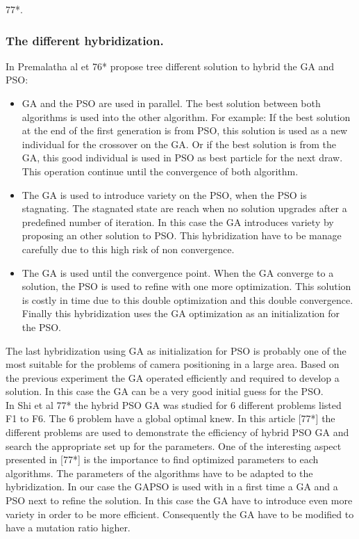    77*\cite{c13}.
\subsubsection{The different hybridization.}

In Premalatha al et 76*  propose tree different solution to hybrid the GA and PSO: 
\begin{itemize}
\item  GA and the PSO are used in parallel. The best solution between both algorithms is used into the other algorithm. 
For example: If the best solution at the end of the first generation is from PSO, this solution is used as a new individual for the crossover on the GA. Or if the best solution is from the GA, this good individual is used in PSO as best particle for the next draw. This operation continue until the convergence of both algorithm.   
 
\item The GA is used to introduce variety on the PSO, when the PSO is stagnating. The stagnated state are reach when no solution upgrades after a predefined number of iteration. In this case the GA introduces variety by proposing an other solution to PSO. This hybridization have to be manage carefully due to this high risk of non convergence. 

\item The GA is used until the convergence point. When the GA converge to a solution, the PSO is used to refine  with one more optimization. This solution is costly in time due to this double optimization and this double convergence. Finally this hybridization uses the GA optimization as an initialization for the PSO.\\
\end{itemize}

The last hybridization using GA as initialization for PSO is probably one of the most suitable for the problems of camera positioning in a large area. 
Based on the previous experiment the  GA operated efficiently  and required to develop a  %
solution.  %
In this case the GA can be a very good initial guess for the PSO. \\

In Shi et al 77*\cite{c13} the hybrid PSO GA was studied for 6 different problems listed F1 to F6. The 6 problem have a global optimal knew.  In this article [77*] the different problems are used to demonstrate the efficiency of hybrid PSO GA and search the appropriate set up for the parameters. One of the interesting aspect presented in [77*] is the importance to find optimized parameters to each algorithms. 
The parameters of the algorithms have to be adapted to the hybridization.
 In our case the GAPSO is used with in a first time a GA and a PSO next to refine the solution. In this case the GA have to introduce even more variety in order to be more efficient. Consequently the GA have to be modified to have a mutation ratio higher.   



